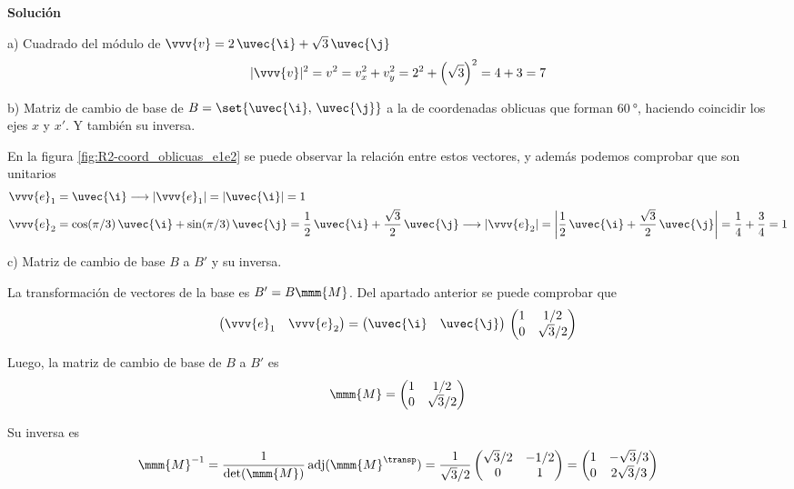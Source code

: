 \noindent
\textbf{Solución}

\noindent
a) Cuadrado del módulo de $\vvv{v} = 2\,\uvec{\i} + \sqrt{3}\,\uvec{\j}$
\[
  |\vvv{v}|^2 = v^2 = v_x^2 + v_y^2 = 2^2 + \left(\sqrt{3}\right)^2 = 4 + 3 = 7
\]

\noindent 
b) Matriz de cambio de base de $B=\set{\uvec{\i},\,\uvec{\j}}$ a la de coordenadas
oblicuas que forman $\qty{60}{\degree}$, haciendo coincidir los ejes $x$ y $x'$.
Y también su inversa.

En la figura \ref{fig:R2-coord_oblicuas_e1e2} se puede observar la relación entre estos
vectores, y además podemos comprobar que son unitarios
\begin{align*}
  \vvv{e}_1
  &=
    \uvec{\i}
    \longrightarrow
    |\vvv{e}_1| = |\uvec{\i}|
    = 1\\
  \vvv{e}_2
  &=
    \cos(\pi/3)\,\uvec{\i} + \sin(\pi/3)\,\uvec{\j}
    = \dfrac{1}{2}\,\uvec{\i} + \dfrac{\sqrt{3}}{2}\,\uvec{\j}
    \longrightarrow
    |\vvv{e}_2| = \left|\dfrac{1}{2}\,\uvec{\i}+\dfrac{\sqrt{3}}{2}\,\uvec{\j}\right|
    = \dfrac{1}{4} + \dfrac{3}{4}
    = 1
\end{align*}

\noindent
c) Matriz de cambio de base $B$ a $B'$ y su inversa.

La transformación de vectores de la base es $B'=B \mmm{M}$.
Del apartado anterior se puede comprobar que
\[
  \begin{pmatrix}
    \vvv{e}_1 & \vvv{e}_2
  \end{pmatrix}
  = \begin{pmatrix}
    \uvec{\i} & \uvec{\j}
  \end{pmatrix}
  \,\begin{pmatrix}
    1 & 1/2\\
    0 & \sqrt{3}/2
  \end{pmatrix}
\]

Luego, la matriz de cambio de base de $B$ a $B'$ es
\[
  \mmm{M}
  = \begin{pmatrix}
    1 & 1/2\\
    0 & \sqrt{3}/2
  \end{pmatrix}
\]

Su inversa es
\[
  \mmm{M}^{-1}
  = \dfrac{1}{\det(\mmm{M})}\,
  \text{adj}(\mmm{M}^\transp)
  = \dfrac{1}{\sqrt{3}/2}
  \begin{pmatrix}
    \sqrt{3}/2 & -1/2\\
    0 & 1
  \end{pmatrix}
  = \begin{pmatrix}
    1 & -\sqrt{3}/3\\
    0 & 2\sqrt{3}/3
  \end{pmatrix}
\]

